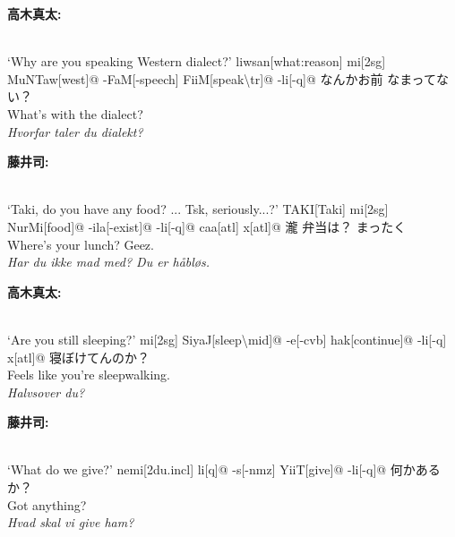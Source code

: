 \begin{paracol}{2}
\bigskip
\switchcolumn*
\hfill \textbf{高木真太:}

\switchcolumn

\exdisplay[lingstyle=Conversation]
\begingl 
\glpreamble
\textbf{}\\
`Why are you speaking Western dialect?'
\endpreamble
liwsan[what:reason]
mi[\sc 2sg]
MuNTaw[west]@
-FaM[-speech]
FiiM[speak\textbackslash{\sc tr}]@
-li[\sc -q]@
\glft
なんかお前 なまってない？\\
What's with the dialect?\\
\textit{Hvorfar taler du dialekt?}
\endgl
\xe

\bigskip
\switchcolumn*
\hfill \textbf{藤井司:}

\switchcolumn

\exdisplay[lingstyle=Conversation]
\begingl 
\glpreamble
\textbf{}\\
`Taki, do you have any food? ... Tsk, seriously...?'
\endpreamble
\textrm{T}AKI[Taki]
mi[\sc 2sg]
NurMi[food]@
-ila[\sc -exist]@
-li[\sc -q]@
caa[\sc atl]
x[\sc atl]@
\glft
瀧 弁当は？ まったく\\
Where's your lunch? Geez.\\
\textit{Har du ikke mad med? Du er håbløs.}
\endgl
\xe

\bigskip
\switchcolumn*
\hfill \textbf{高木真太:}

\switchcolumn

\exdisplay[lingstyle=Conversation]
\begingl 
\glpreamble
\textbf{}\\
`Are you still sleeping?'
\endpreamble
mi[\sc 2sg]
SiyaJ[sleep\textbackslash{\sc mid}]@
-e\lilglot{}[\sc -cvb]
hak[continue]@
-li[\sc -q]
x[\sc atl]@
\glft
寝ぼけてんのか？\\
Feels like you're sleepwalking.\\
\textit{Halvsover du?}
\endgl
\xe

\bigskip
\switchcolumn*
\hfill \textbf{藤井司:}

\switchcolumn

\exdisplay[lingstyle=Conversation]
\begingl 
\glpreamble
\textbf{}\\
`What do we give?'
\endpreamble
nemi[\sc 2du.incl]
li[\sc q]@
-s[\sc -nmz]
YiiT[give]@
-li[\sc -q]@
\glft
何かあるか？\\
Got anything?\\
\textit{Hvad skal vi give ham?}
\endgl
\xe


\end{paracol}
